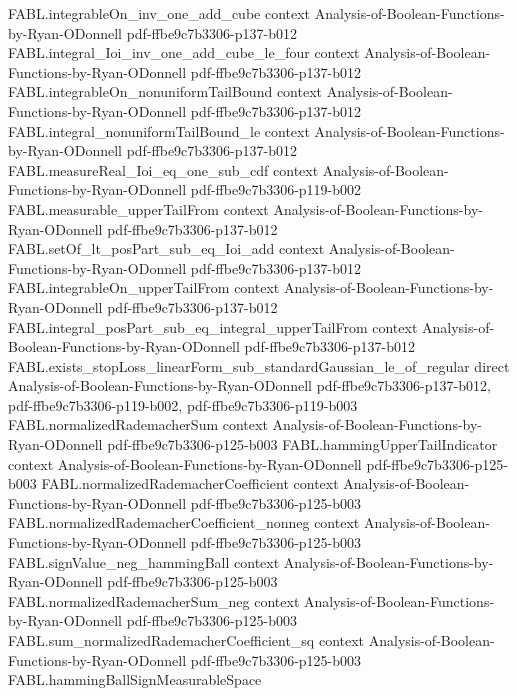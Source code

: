 \begin{theorem}
\proofstep
  {FABL.integrableOn_inv_one_add_cube}
  {context}
  {Analysis-of-Boolean-Functions-by-Ryan-ODonnell}
  {pdf-ffbe9c7b3306-p137-b012}
\proofstep
  {FABL.integral_Ioi_inv_one_add_cube_le_four}
  {context}
  {Analysis-of-Boolean-Functions-by-Ryan-ODonnell}
  {pdf-ffbe9c7b3306-p137-b012}
\proofstep
  {FABL.integrableOn_nonuniformTailBound}
  {context}
  {Analysis-of-Boolean-Functions-by-Ryan-ODonnell}
  {pdf-ffbe9c7b3306-p137-b012}
\proofstep
  {FABL.integral_nonuniformTailBound_le}
  {context}
  {Analysis-of-Boolean-Functions-by-Ryan-ODonnell}
  {pdf-ffbe9c7b3306-p137-b012}
\proofstep
  {FABL.measureReal_Ioi_eq_one_sub_cdf}
  {context}
  {Analysis-of-Boolean-Functions-by-Ryan-ODonnell}
  {pdf-ffbe9c7b3306-p119-b002}
\proofstep
  {FABL.measurable_upperTailFrom}
  {context}
  {Analysis-of-Boolean-Functions-by-Ryan-ODonnell}
  {pdf-ffbe9c7b3306-p137-b012}
\proofstep
  {FABL.setOf_lt_posPart_sub_eq_Ioi_add}
  {context}
  {Analysis-of-Boolean-Functions-by-Ryan-ODonnell}
  {pdf-ffbe9c7b3306-p137-b012}
\proofstep
  {FABL.integrableOn_upperTailFrom}
  {context}
  {Analysis-of-Boolean-Functions-by-Ryan-ODonnell}
  {pdf-ffbe9c7b3306-p137-b012}
\proofstep
  {FABL.integral_posPart_sub_eq_integral_upperTailFrom}
  {context}
  {Analysis-of-Boolean-Functions-by-Ryan-ODonnell}
  {pdf-ffbe9c7b3306-p137-b012}
\proofstep
  {FABL.exists_stopLoss_linearForm_sub_standardGaussian_le_of_regular}
  {direct}
  {Analysis-of-Boolean-Functions-by-Ryan-ODonnell}
  {pdf-ffbe9c7b3306-p137-b012,
    pdf-ffbe9c7b3306-p119-b002,
    pdf-ffbe9c7b3306-p119-b003}
\proofstep
  {FABL.normalizedRademacherSum}
  {context}
  {Analysis-of-Boolean-Functions-by-Ryan-ODonnell}
  {pdf-ffbe9c7b3306-p125-b003}
\proofstep
  {FABL.hammingUpperTailIndicator}
  {context}
  {Analysis-of-Boolean-Functions-by-Ryan-ODonnell}
  {pdf-ffbe9c7b3306-p125-b003}
\proofstep
  {FABL.normalizedRademacherCoefficient}
  {context}
  {Analysis-of-Boolean-Functions-by-Ryan-ODonnell}
  {pdf-ffbe9c7b3306-p125-b003}
\proofstep
  {FABL.normalizedRademacherCoefficient_nonneg}
  {context}
  {Analysis-of-Boolean-Functions-by-Ryan-ODonnell}
  {pdf-ffbe9c7b3306-p125-b003}
\proofstep
  {FABL.signValue_neg_hammingBall}
  {context}
  {Analysis-of-Boolean-Functions-by-Ryan-ODonnell}
  {pdf-ffbe9c7b3306-p125-b003}
\proofstep
  {FABL.normalizedRademacherSum_neg}
  {context}
  {Analysis-of-Boolean-Functions-by-Ryan-ODonnell}
  {pdf-ffbe9c7b3306-p125-b003}
\proofstep
  {FABL.sum_normalizedRademacherCoefficient_sq}
  {context}
  {Analysis-of-Boolean-Functions-by-Ryan-ODonnell}
  {pdf-ffbe9c7b3306-p125-b003}
\proofstep
  {FABL.hammingBallSignMeasurableSpace}

\end{theorem}
